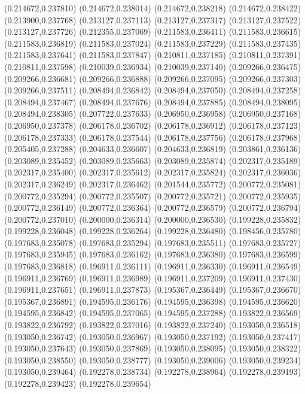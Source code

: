 (0.214672,0.237810)
(0.214672,0.238014)
(0.214672,0.238218)
(0.214672,0.238422)
(0.213900,0.237768)
(0.213127,0.237113)
(0.213127,0.237317)
(0.213127,0.237522)
(0.213127,0.237726)
(0.212355,0.237069)
(0.211583,0.236411)
(0.211583,0.236615)
(0.211583,0.236819)
(0.211583,0.237024)
(0.211583,0.237229)
(0.211583,0.237435)
(0.211583,0.237641)
(0.211583,0.237847)
(0.210811,0.237185)
(0.210811,0.237391)
(0.210811,0.237598)
(0.210039,0.236934)
(0.210039,0.237140)
(0.209266,0.236475)
(0.209266,0.236681)
(0.209266,0.236888)
(0.209266,0.237095)
(0.209266,0.237303)
(0.209266,0.237511)
(0.208494,0.236842)
(0.208494,0.237050)
(0.208494,0.237258)
(0.208494,0.237467)
(0.208494,0.237676)
(0.208494,0.237885)
(0.208494,0.238095)
(0.208494,0.238305)
(0.207722,0.237633)
(0.206950,0.236958)
(0.206950,0.237168)
(0.206950,0.237378)
(0.206178,0.236702)
(0.206178,0.236912)
(0.206178,0.237123)
(0.206178,0.237333)
(0.206178,0.237544)
(0.206178,0.237756)
(0.206178,0.237968)
(0.205405,0.237288)
(0.204633,0.236607)
(0.204633,0.236819)
(0.203861,0.236136)
(0.203089,0.235452)
(0.203089,0.235663)
(0.203089,0.235874)
(0.202317,0.235189)
(0.202317,0.235400)
(0.202317,0.235612)
(0.202317,0.235824)
(0.202317,0.236036)
(0.202317,0.236249)
(0.202317,0.236462)
(0.201544,0.235772)
(0.200772,0.235081)
(0.200772,0.235294)
(0.200772,0.235507)
(0.200772,0.235721)
(0.200772,0.235935)
(0.200772,0.236149)
(0.200772,0.236364)
(0.200772,0.236579)
(0.200772,0.236794)
(0.200772,0.237010)
(0.200000,0.236314)
(0.200000,0.236530)
(0.199228,0.235832)
(0.199228,0.236048)
(0.199228,0.236264)
(0.199228,0.236480)
(0.198456,0.235780)
(0.197683,0.235078)
(0.197683,0.235294)
(0.197683,0.235511)
(0.197683,0.235727)
(0.197683,0.235945)
(0.197683,0.236162)
(0.197683,0.236380)
(0.197683,0.236599)
(0.197683,0.236818)
(0.196911,0.236111)
(0.196911,0.236330)
(0.196911,0.236549)
(0.196911,0.236769)
(0.196911,0.236989)
(0.196911,0.237209)
(0.196911,0.237430)
(0.196911,0.237651)
(0.196911,0.237873)
(0.195367,0.236449)
(0.195367,0.236670)
(0.195367,0.236891)
(0.194595,0.236176)
(0.194595,0.236398)
(0.194595,0.236620)
(0.194595,0.236842)
(0.194595,0.237065)
(0.194595,0.237288)
(0.193822,0.236569)
(0.193822,0.236792)
(0.193822,0.237016)
(0.193822,0.237240)
(0.193050,0.236518)
(0.193050,0.236742)
(0.193050,0.236967)
(0.193050,0.237192)
(0.193050,0.237417)
(0.193050,0.237643)
(0.193050,0.237869)
(0.193050,0.238095)
(0.193050,0.238322)
(0.193050,0.238550)
(0.193050,0.238777)
(0.193050,0.239006)
(0.193050,0.239234)
(0.193050,0.239464)
(0.192278,0.238734)
(0.192278,0.238964)
(0.192278,0.239193)
(0.192278,0.239423)
(0.192278,0.239654)
